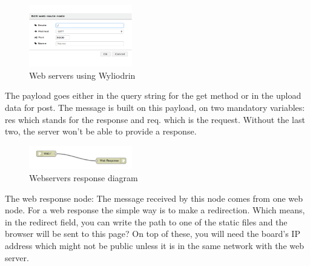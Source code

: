 \begin{figure}[ht]
    \centering
    \includegraphics[width=0.4\textwidth]{figures/Web servers using Wyliodrin.png}
    \caption{Web servers using Wyliodrin}
\end{figure}

The payload goes either in the query string for the get method or in the upload data for post. The message is built on this payload, on two mandatory variables: res which stands for the response and req. which is the request. Without the last two, the server won't be able to provide a response.

\begin{figure}[ht]
    \centering
    \includegraphics[width=0.4\textwidth]{figures/Webservers response.png}
    \caption{Webservers response diagram}
\end{figure}

The web response node: The message received by this node comes from one web node. For a web response the simple way is to make a redirection. Which means, in the redirect field, you can write the path to one of the static files and the browser will be sent to this page? On top of these, you will need the board's IP address which might not be public unless it is in the same network with the web server. 

